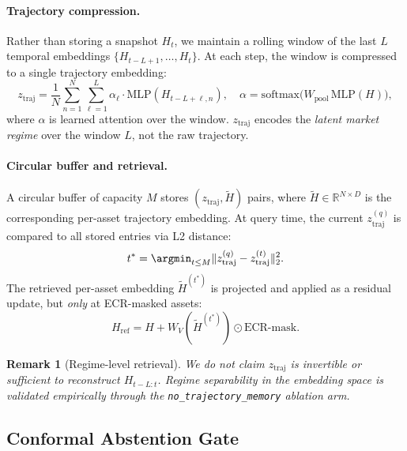\documentclass[11pt,a4paper]{article}
\newtheorem{remark}{Remark}
\newcommand{\ztraj}{z_{\mathrm{traj}}}
\begin{document}
\paragraph{Trajectory compression.}
Rather than storing a snapshot $H_t$, we maintain a rolling window of the
last $L$ temporal embeddings $\{H_{t-L+1}, \ldots, H_t\}$.  At each step,
the window is compressed to a single trajectory embedding:
\begin{equation}
  \ztraj = \frac{1}{N}\sum_{n=1}^N
    \sum_{\ell=1}^{L} \alpha_\ell \cdot \mathrm{MLP}(H_{t-L+\ell,n}),
  \quad
  \alpha = \mathrm{softmax}\!\bigl(W_{\mathrm{pool}}\,\mathrm{MLP}(H)\bigr),
\end{equation}
where $\alpha$ is learned attention over the window.  $\ztraj$ encodes the
\emph{latent market regime} over the window $L$, not the raw trajectory.

\paragraph{Circular buffer and retrieval.}
A circular buffer of capacity $M$ stores $(\ztraj, \tilde{H})$ pairs, where
$\tilde{H} \in \mathbb{R}^{N \times D}$ is the corresponding per-asset
trajectory embedding.  At query time, the current $\ztraj^{(q)}$ is compared
to all stored entries via L2 distance:
\begin{equation}
  t^* = \argmin_{t \le M} \|\ztraj^{(q)} - \ztraj^{(t)}\|_2^2.
\end{equation}
The retrieved per-asset embedding $\tilde{H}^{(t^*)}$ is projected and
applied as a residual update, but \emph{only} at ECR-masked assets:
\begin{equation}
  H_{\mathrm{ref}} = H + W_V(\tilde{H}^{(t^*)}) \odot \mathrm{ECR\text{-}mask}.
\end{equation}

\begin{remark}[Regime-level retrieval]
We do not claim $\ztraj$ is invertible or sufficient to reconstruct
$H_{t-L:t}$.  Regime separability in the embedding space is validated
empirically through the \texttt{no\_trajectory\_memory} ablation arm.
\end{remark}

\subsection{Conformal Abstention Gate}
\label{sec:conformal}
\end{document}
